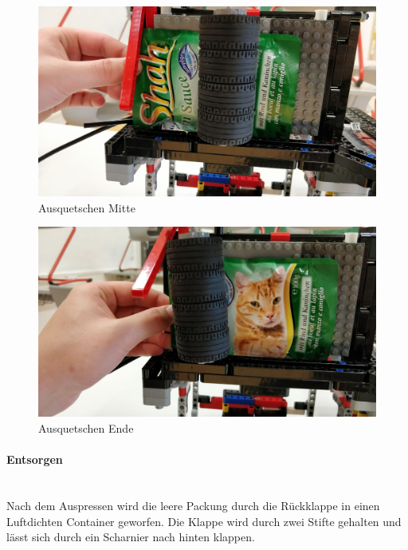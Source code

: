 \documentclass[a4paper,12pt]{scrartcl}
\begin{document}
\begin{figure}[H]
\begin{center}
\includegraphics[width=13cm]{Bilder/Ablauf_1_png/Ausquetschen_2}
\caption{Ausquetschen Mitte}
\end{center}
\end{figure}

\begin{figure}[H]
\begin{center}
\includegraphics[width=13cm]{Bilder/Ablauf_1_png/Ausquetschen_3}
\caption{Ausquetschen Ende}
\end{center}
\end{figure}
\newpage
\paragraph{Entsorgen}$~~$\\ 

Nach dem Auspressen wird die leere Packung durch die Rückklappe in einen Luftdichten Container geworfen. Die Klappe wird durch zwei Stifte gehalten und lässt sich durch ein Scharnier nach hinten klappen. 
\end{document}
